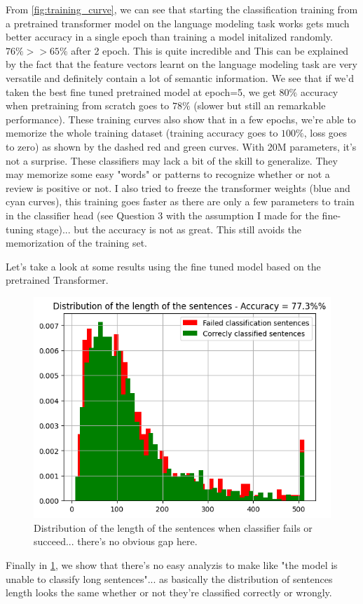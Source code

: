 \documentclass[a4paper]{article}
\begin{document}
From \ref{fig:training_curve}, we can see that starting the classification training from a pretrained transformer model on the language modeling task
works gets much better accuracy in a single epoch than training a model initalized randomly. $76\% >> 65\%$ after 2 epoch. This is quite incredible and
This can be explained by the fact that the feature vectors learnt on the language modeling task are very versatile and definitely contain a lot
of semantic information.
We see that if we'd taken the best fine tuned pretrained model at epoch=5, we get $80\%$ accuracy when pretraining from scratch goes to $78\%$ (slower but
still an remarkable performance).
These training curves also show that in a few epochs, we're able to memorize the whole training dataset (training accuracy goes to $100\%$, loss goes to zero)
as shown by the dashed red and green curves. With 20M parameters, it's not a surprise. These classifiers may lack a bit of the skill to generalize.
They may memorize some easy "words" or patterns to recognize whether or not a review is positive or not.
I also tried to freeze the transformer weights (blue and cyan curves), this training goes faster as there are only a few parameters to train
in the classifier head (see Question 3 with the assumption I made for the fine-tuning stage)... but the accuracy is not as great.  This still avoids
the memorization of the training set.

Let's take a look at some results using the fine tuned model based on the pretrained Transformer.
\begin{figure}[ht]
    \centering
    \includegraphics[width=.6\textwidth]{figures/distribution_of_sentences_length.png}
    \caption{Distribution of the length of the sentences when classifier fails or succeed... there's no obvious gap here.}
    \label{fig:length_distribution}
\end{figure}
Finally in \ref{fig:length_distribution}, we show that there's no easy analyzis to make like "the model is unable to classify long sentences"...
as basically the distribution of sentences length looks the same whether or not they're classified correctly or wrongly.
\end{document}
